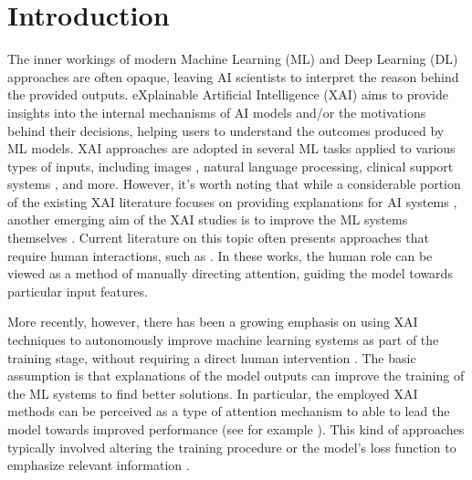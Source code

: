\section{Introduction}
\label{sec:intro}
The inner workings of modern Machine Learning (ML) and Deep Learning (DL) approaches are often opaque, leaving AI scientists to interpret the reason behind the provided outputs. eXplainable Artificial Intelligence (XAI) aims to provide insights into the internal mechanisms of AI models and/or the motivations behind their decisions, helping users to understand the outcomes produced by ML models. XAI approaches are adopted in several ML tasks applied to various types of inputs, including images \cite{ribeiro2016should,apicella2019explaining,montavon2019layer}, natural language processing, clinical support systems \cite{schoonderwoerd2021human,annuzzi2023impact}, and more.
However, it's worth noting that while a considerable portion of the existing XAI literature focuses on providing explanations for AI systems \cite{lipton2018mythos,miller2019explanation,arrieta2019explainable}, another emerging aim of the XAI studies is to improve the ML systems themselves \cite{weber2022beyond}. Current literature on this topic often presents approaches that require human interactions, such as \cite{teso2019explanatory,schramowski2020making,hagos2022impact,ijcai2017p371,mitsuhara2019embedding,zunino2021explainable,selvaraju2019taking}. %
In these works, the human role can be viewed as a method of manually directing attention, guiding the model towards particular input features.

More recently, however, there has been a growing emphasis on using XAI techniques to autonomously improve machine learning systems as part of the training stage, without requiring a direct human intervention \cite{weber2022beyond,sun2022utilizing,liu2023icel,sun2021explanation}.
The basic assumption is that explanations of the model outputs can improve the training of the ML systems to find better solutions. In particular, the employed XAI methods can be perceived as a type of attention mechanism \cite{vaswani2017attention} to able to lead the model towards improved performance (see for example \cite{fukui2019attention}). 
This kind of approaches typically involved altering the training procedure or the model's loss function to emphasize relevant information \cite{yeom2021pruning,ijcai2017p371,liu-avci-2019-incorporating}. %


